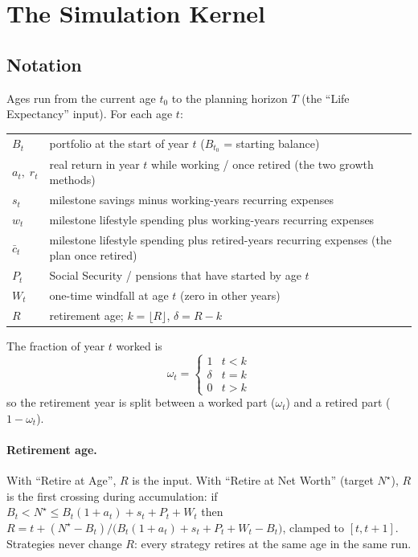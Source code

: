 \documentclass[11pt,letterpaper]{article}
\begin{document}
\section{The Simulation Kernel}
\label{sec:kernel}

\subsection{Notation}

Ages run from the current age $t_0$ to the planning horizon $T$ (the ``Life Expectancy'' input). For each age $t$:

\begin{center}
\begin{tabular}{@{}ll@{}}
\toprule
$B_t$ & portfolio at the start of year $t$ ($B_{t_0}$ = starting balance) \\
$a_t,\; r_t$ & real return in year $t$ while working / once retired (the two growth methods) \\
$s_t$ & milestone savings minus working-years recurring expenses \\
$w_t$ & milestone lifestyle spending plus working-years recurring expenses \\
$\bar c_t$ & milestone lifestyle spending plus retired-years recurring expenses (the plan once retired) \\
$P_t$ & Social Security / pensions that have started by age $t$ \\
$W_t$ & one-time windfall at age $t$ (zero in other years) \\
$R$ & retirement age; $k=\lfloor R\rfloor$, $\delta = R-k$ \\
\bottomrule
\end{tabular}
\end{center}

The fraction of year $t$ worked is
\begin{equation}
\omega_t = \begin{cases} 1 & t < k \\ \delta & t = k \\ 0 & t > k \end{cases}
\end{equation}
so the retirement year is split between a worked part ($\omega_t$) and a retired part ($1-\omega_t$).

\paragraph{Retirement age.} With ``Retire at Age'', $R$ is the input. With ``Retire at Net Worth'' (target $N^\star$), $R$ is the first crossing during accumulation: if $B_t < N^\star \le B_t(1+a_t)+s_t+P_t+W_t$ then $R = t + (N^\star - B_t)/\big(B_t(1+a_t)+s_t+P_t+W_t - B_t\big)$, clamped to $[t, t+1]$. Strategies never change $R$: every strategy retires at the same age in the same run.
\end{document}
